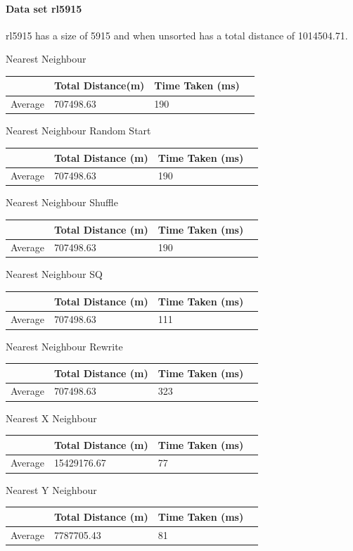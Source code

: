 \documentclass[conference,backref=page]{acmsiggraph}
\begin{document}
\paragraph{Data set rl5915} \hfill

rl5915 has a size of 5915 and when unsorted has a total distance of 1014504.71.

\begin{center}	
	
	Nearest Neighbour
	\begin{tabular}{| l | l | l | l |}
		\hline
		& Total Distance(m)& Time Taken (ms)\\ \hline
		Average & 707498.63 & 190 \\ \hline
	\end{tabular}

	Nearest Neighbour Random Start
	\begin{tabular}{| l | l | l | l |}
		\hline
		& Total Distance (m) & Time Taken (ms)\\ \hline
		Average & 707498.63 & 190 \\ \hline
	\end{tabular}

	Nearest Neighbour Shuffle
	\begin{tabular}{| l | l | l | l |}
		\hline
		& Total Distance (m) & Time Taken (ms)\\ \hline
		Average & 707498.63 & 190 \\ \hline
	\end{tabular}

	Nearest Neighbour SQ
	\begin{tabular}{| l | l | l | l |}
		\hline
		& Total Distance (m) & Time Taken (ms)\\ \hline
		Average & 707498.63 & 111 \\ \hline
	\end{tabular}

	Nearest Neighbour Rewrite
	\begin{tabular}{| l | l | l | l |}
		\hline
		& Total Distance (m) & Time Taken (ms)\\ \hline
		Average & 707498.63 & 323 \\ \hline
	\end{tabular}
	
	
	Nearest X Neighbour	
	\begin{tabular}{| l | l | l | l |}
		\hline
		& Total Distance (m) & Time Taken (ms)\\ \hline
		Average & 15429176.67 & 77 \\ \hline	
	\end{tabular}
	
	Nearest Y Neighbour	
	\begin{tabular}{| l | l | l | l |}
		\hline
		& Total Distance (m) & Time Taken (ms)\\ \hline
		Average & 7787705.43 & 81 \\ \hline
	\end{tabular}
\end{center}
\end{document}
